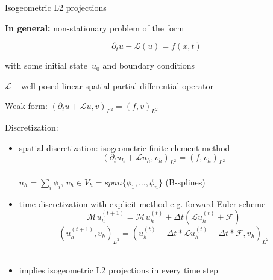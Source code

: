 \documentclass[c]{beamer}
\newcommand{\Prod}[2]{(#1, #2)_{L^2}}
\begin{document}
\begin{frame}{Isogeometric L2 projections}


\textbf{In general:} non-stationary problem of the form

\begin{equation*}
  \partial_t u - \mathcal{L}(u) = f(x, t)
\end{equation*}

with some initial state~$u_0$ and boundary conditions
\vspace{2mm}

$\mathcal{L}$ -- well-posed linear spatial partial differential operator

Weak form:
  $\Prod{\partial_t u + \mathcal{L}u}{v} = \Prod{f}{v}$

\vspace{3mm}

Discretization:
\begin{itemize}
  \item spatial discretization: isogeometric finite element method
  \begin{equation*}
  \Prod{\partial_t u_h + \mathcal{L}u_h}{v_h} = \Prod{f}{v_h}
  \end{equation*}
  \\\vspace{2mm}
  $u_h = \sum_i \phi_i$, $v_h\in V_h=span\{\phi_1,\ldots,\phi_n\}$ (B-splines)
  \\\vspace{2mm}
  \item time discretization with explicit method 
  e.g. forward Euler scheme
  \begin{equation*}
   \mathcal{M} u_h^{(t + 1)} =
   \mathcal{M} u_h^{(t)} +
   \Delta t \left(\mathcal{L}u_h^{(t)} + \mathcal{F}\right)
\end{equation*}
\begin{equation*}
  \Prod{u_h^{(t+1)}}{v_h} =  \Prod{u_{h}^{(t)}- \Delta t * \mathcal{L}u_h^{(t)} +\Delta t * \mathcal{F}}{v_h} 
\end{equation*}
  \\\vspace{2mm}
  \item   implies isogeometric L2 projections in every time step 
  
\end{itemize}

\end{frame}



\end{document}
